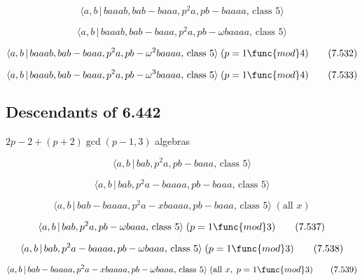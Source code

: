 \documentclass[10pt]{article}
\begin{document}
\begin{equation}
\langle a,b\,|\,baaab,bab-baaa,p^2a,pb-baaaa,\,\text{class }5\rangle 
\tag{7.530}
\end{equation}

\begin{equation}
\langle a,b\,|\,baaab,bab-baaa,p^{2}a,pb-\omega baaaa,\,\text{class }5\rangle
\tag{7.531}
\end{equation}

\begin{equation}
\langle a,b\,|\,baaab,bab-baaa,p^{2}a,pb-\omega ^{2}baaaa,\,\text{class }%
5\rangle \;(p=1\func{mod}4)  \tag{7.532}
\end{equation}

\begin{equation}
\langle a,b\,|\,baaab,bab-baaa,p^{2}a,pb-\omega ^{3}baaaa,\,\text{class }%
5\rangle \;(p=1\func{mod}4)  \tag{7.533}
\end{equation}

\subsection{Descendants of 6.442}

$2p-2+(p+2)\gcd (p-1,3)$ algebras

\begin{equation}
\langle a,b\,|\,bab,p^2a,pb-baaa,\,\text{class }5\rangle  \tag{7.534}
\end{equation}

\begin{equation}
\langle a,b\,|\,bab,p^2a-baaaa,pb-baaa,\,\text{class }5\rangle  \tag{7.535}
\end{equation}

\begin{equation}
\langle a,b\,|\,bab-baaaa,p^2a-xbaaaa,pb-baaa,\,\text{class }5\rangle \;(%
\text{all }x)  \tag{7.536}
\end{equation}

\begin{equation}
\langle a,b\,|\,bab,p^{2}a,pb-\omega baaa,\,\text{class }5\rangle \;(p=1%
\func{mod}3)  \tag{7.537}
\end{equation}

\begin{equation}
\langle a,b\,|\,bab,p^{2}a-baaaa,pb-\omega baaa,\,\text{class }5\rangle
\;(p=1\func{mod}3)  \tag{7.538}
\end{equation}

\begin{equation}
\langle a,b\,|\,bab-baaaa,p^{2}a-xbaaaa,pb-\omega baaa,\,\text{class }%
5\rangle \;(\text{all }x,\;p=1\func{mod}3)  \tag{7.539}
\end{equation}
\end{document}
